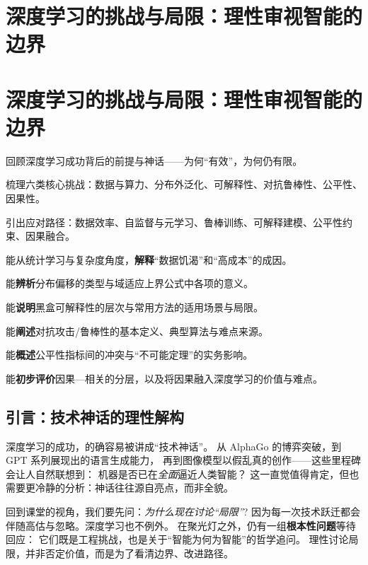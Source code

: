 \chapter{深度学习的挑战与局限：理性审视智能的边界}

\chapter{深度学习的挑战与局限：理性审视智能的边界}

\begin{introduction}[本章提要]
  \item 回顾深度学习成功背后的前提与神话——为何“有效”，为何仍有限。
  \item 梳理六类核心挑战：数据与算力、分布外泛化、可解释性、对抗鲁棒性、公平性、因果性。
  \item 引出应对路径：数据效率、自监督与元学习、鲁棒训练、可解释建模、公平性约束、因果融合。
\end{introduction}

\begin{introduction}[你将收获]
  \item 能从统计学习与复杂度角度，\textbf{解释}“数据饥渴”和“高成本”的成因。
  \item 能\textbf{辨析}分布偏移的类型与域适应上界公式中各项的意义。
  \item 能\textbf{说明}黑盒可解释性的层次与常用方法的适用场景与局限。
  \item 能\textbf{阐述}对抗攻击/鲁棒性的基本定义、典型算法与难点来源。
  \item 能\textbf{概述}公平性指标间的冲突与“不可能定理”的实务影响。
  \item 能\textbf{初步评价}因果—相关的分层，以及将因果融入深度学习的价值与难点。
\end{introduction}

\section{引言：技术神话的理性解构}

深度学习的成功，的确容易被讲成“技术神话”。  
从 AlphaGo 的博弈突破，到 GPT 系列展现出的语言生成能力，  
再到图像模型以假乱真的创作——这些里程碑会让人自然联想到：  
机器是否已在\textit{全面}逼近人类智能？  
这一直觉值得肯定，但也需要更冷静的分析：神话往往源自亮点，而非全貌。

回到课堂的视角，我们要先问：\textit{为什么现在讨论“局限”}?  
因为每一次技术跃迁都会伴随高估与忽略。深度学习也不例外。  
在聚光灯之外，仍有一组\textbf{根本性问题}等待回应：  
它们既是工程挑战，也是关于“智能为何为智能”的哲学追问。  
理性讨论局限，并非否定价值，而是为了看清边界、改进路径。

